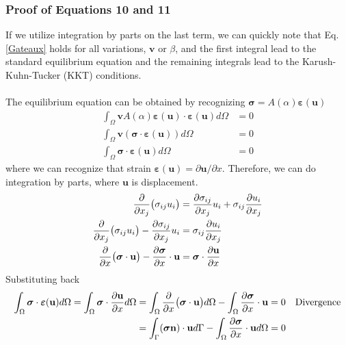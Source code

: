\documentclass[12pt,3p]{article}
\numberwithin{equation}{section}
\begin{document}
\subsubsection{Proof of Equations 10 and 11}
If we utilize integration by parts on the last term, we can quickly note that Eq. \ref{Gateaux} holds for all variations, $\mathbf{v}$ or $\beta$, and the first integral lead to the standard equilibrium equation and the remaining integrals lead to the Karush-Kuhn-Tucker (KKT) conditions. \\ \\
The equilibrium equation can be obtained by recognizing $\boldsymbol{\sigma} = A(\alpha) \boldsymbol{\varepsilon} (\mathbf{u})$
\begin{align*}
\int_{\Omega} \mathbf{v} A(\alpha) \boldsymbol{\varepsilon} (\mathbf{u}) \cdot \boldsymbol{\varepsilon} (\mathbf{u}) d \Omega &= 0 \\ 
\int_{\Omega} \mathbf{v} ( \boldsymbol{\sigma} \cdot \boldsymbol{\varepsilon} (\mathbf{u})) d \Omega &= 0 \\
\int_{\Omega} \boldsymbol{\sigma} \cdot \boldsymbol{\varepsilon} (\mathbf{u}) d \Omega &= 0 
\end{align*}
where we can recognize that strain $\boldsymbol{\varepsilon} (\mathbf{u}) = \partial \mathbf{u} / \partial x$. Therefore, we can do integration by parts, where $\mathbf{u}$ is displacement. 
\begin{align*}
\pdv{}{x_j} \big( \sigma_{ij} u_i \big) &= \pdv{\sigma_{ij}}{x_j} u_i + \sigma_{ij} \pdv{u_i}{x_j} \\
\pdv{}{x_j} \big( \sigma_{ij} u_i \big) - \pdv{\sigma_{ij}}{x_j} u_i &= \sigma_{ij} \pdv{u_i}{x_j} \\
\pdv{}{x} \big( \boldsymbol{\sigma} \cdot \mathbf{u} \big) - \pdv{\boldsymbol{\sigma}}{x} \cdot \mathbf{u} &= \boldsymbol{\sigma} \cdot \pdv{\mathbf{u}}{x}
\end{align*}
Substituting back 
\begin{align*}
\int_{\Omega} \boldsymbol{\sigma} \cdot \boldsymbol{\varepsilon} (\mathbf{u}) d \Omega = \int_{\Omega} \boldsymbol{\sigma} \cdot \pdv{\mathbf{u}}{x} d \Omega 
&= \int_{\Omega} \pdv{}{x} \big( \boldsymbol{\sigma} \cdot \mathbf{u} \big) d \Omega - \int_{\Omega} \pdv{\boldsymbol{\sigma}}{x} \cdot  \mathbf{u} = 0 \quad \text{Divergence} \\
&= \int_{\Gamma} ( \boldsymbol{\sigma} \mathbf{n} ) \cdot \mathbf{u} d \Gamma - \int_{\Omega} \pdv{\boldsymbol{\sigma}}{x} \cdot \mathbf{u} d \Omega = 0 
\end{align*}
\end{document}
